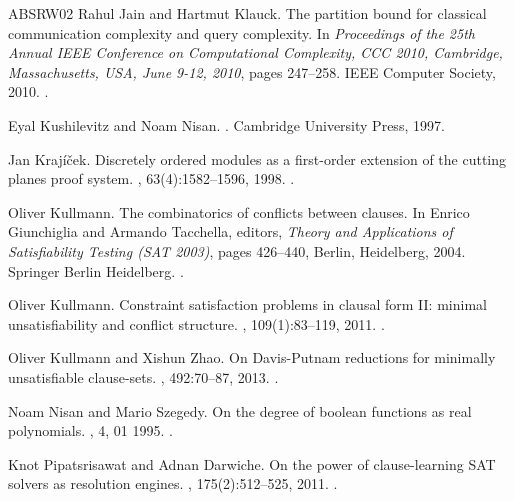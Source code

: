 \documentclass[11pt]{article}
\numberwithin{equation}{section}
\begin{document}
\begin{thebibliography}{ABSRW02}
Rahul Jain and Hartmut Klauck.
\newblock The partition bound for classical communication complexity and query
  complexity.
\newblock In {\em Proceedings of the 25th Annual {IEEE} Conference on
  Computational Complexity, {CCC} 2010, Cambridge, Massachusetts, USA, June
  9-12, 2010}, pages 247--258. {IEEE} Computer Society, 2010.
\newblock \href {https://doi.org/10.1109/CCC.2010.31}
  {}.

Eyal Kushilevitz and Noam Nisan.
.
\newblock Cambridge University Press, 1997.

Jan Krajíček.
\newblock Discretely ordered modules as a first-order extension of the cutting
  planes proof system.
, 63(4):1582–1596, 1998.
\newblock \href {https://doi.org/10.2307/2586668} {}.

Oliver Kullmann.
\newblock The combinatorics of conflicts between clauses.
\newblock In Enrico Giunchiglia and Armando Tacchella, editors, {\em Theory and
  Applications of Satisfiability Testing ({SAT} 2003)}, pages 426--440, Berlin,
  Heidelberg, 2004. Springer Berlin Heidelberg.
\newblock \href {https://doi.org/10.1007/978-3-540-24605-3\_32}
  {}.

Oliver Kullmann.
\newblock Constraint satisfaction problems in clausal form {II:} minimal
  unsatisfiability and conflict structure.
, 109(1):83--119, 2011.
\newblock \href {https://doi.org/10.3233/FI-2011-429}
  {}.

Oliver Kullmann and Xishun Zhao.
\newblock On {D}avis-{P}utnam reductions for minimally unsatisfiable
  clause-sets.
, 492:70--87, 2013.
\newblock \href {https://doi.org/10.1016/j.tcs.2013.04.020}
  {}.

Noam Nisan and Mario Szegedy.
\newblock On the degree of boolean functions as real polynomials.
, 4, 01 1995.
\newblock \href {https://doi.org/10.1145/129712.129757}
  {}.

Knot Pipatsrisawat and Adnan Darwiche.
\newblock On the power of clause-learning {SAT} solvers as resolution engines.
, 175(2):512--525, 2011.
\newblock \href {https://doi.org/10.1016/j.artint.2010.10.002}
  {}.


\end{thebibliography}
\end{document}
